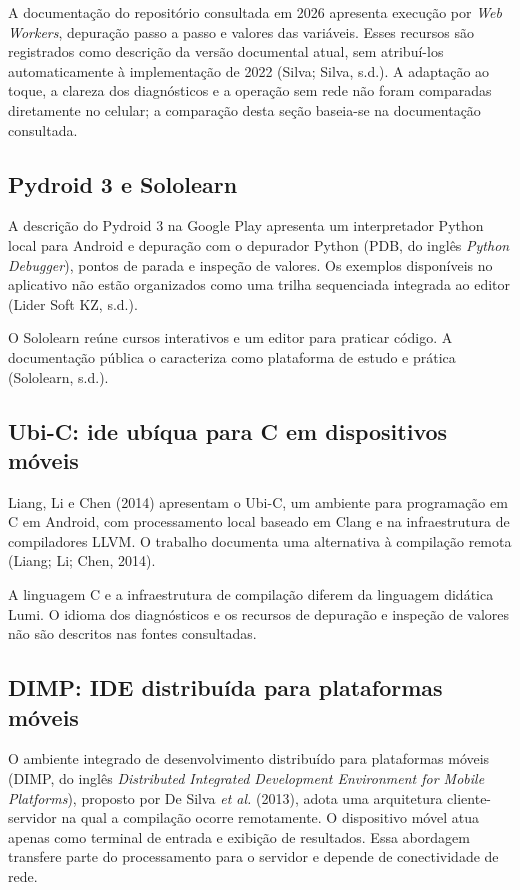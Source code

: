 \documentclass[
    12pt
    ,oneside
    ,a4paper
    ,chapter=TITLE
    ,section=TITLE
    ,sumario=abnt-6027-2012]{abntex2}
\newcommand{\citeLiang}{(Liang; Li; Chen, 2014)}
\newcommand{\textDimp}{De Silva \textit{et al.} (2013)\xspace}
\newcommand{\textLiang}{Liang, Li e Chen (2014)\xspace}
\begin{document}
A documentação do repositório consultada em 2026 apresenta execução por
\textit{Web Workers}, depuração passo a passo e valores das variáveis. Esses
recursos são registrados como descrição da versão documental atual, sem
atribuí-los automaticamente à implementação de 2022
(Silva; Silva, s.d.). A adaptação ao toque, a clareza dos diagnósticos e a operação
sem rede não foram comparadas diretamente no celular; a comparação desta seção
baseia-se na documentação consultada.

\subsection{Pydroid 3 e Sololearn}
A descrição do Pydroid 3 na Google Play apresenta um interpretador Python local
para Android e depuração com o depurador Python (PDB, do inglês
\textit{Python Debugger}), pontos de parada e inspeção de valores.
Os exemplos disponíveis no aplicativo não estão organizados como uma trilha sequenciada integrada ao editor (Lider Soft KZ, s.d.).

O Sololearn reúne cursos interativos e um editor para praticar código. A documentação pública o caracteriza como plataforma de estudo e prática (Sololearn, s.d.).

\subsection{Ubi-C: ide ubíqua para C em dispositivos móveis}

\textLiang apresentam o Ubi-C, um ambiente para programação em C em Android,
com processamento local baseado em Clang e na infraestrutura de compiladores LLVM. O trabalho documenta uma
alternativa à compilação remota \citeLiang.

A linguagem C e a infraestrutura de compilação diferem da linguagem didática
Lumi. O idioma dos diagnósticos e os recursos de depuração e inspeção de valores não são descritos nas fontes consultadas.

\subsection{DIMP: IDE distribuída para plataformas móveis}

O ambiente integrado de desenvolvimento distribuído para plataformas móveis
(DIMP, do inglês \textit{Distributed Integrated Development Environment for Mobile Platforms}),
proposto por \textDimp, adota uma arquitetura cliente-servidor na qual
a compilação ocorre remotamente. O dispositivo móvel atua apenas como terminal de entrada e
exibição de resultados. Essa abordagem transfere parte do processamento para o
servidor e depende de conectividade de rede.
\end{document}
